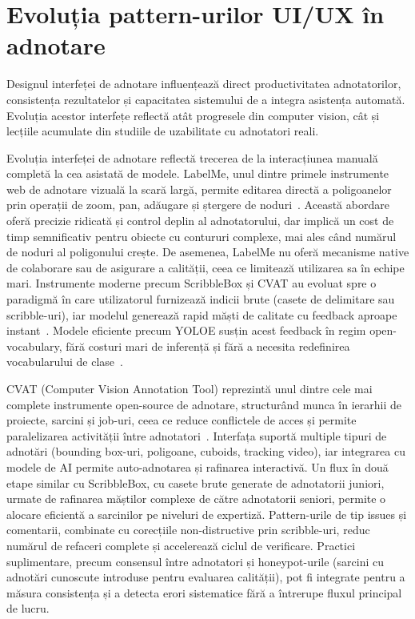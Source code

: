\section{Evoluția pattern-urilor UI/UX în adnotare}

Designul interfeței de adnotare influențează direct productivitatea adnotatorilor, consistența rezultatelor și capacitatea sistemului de a integra asistența automată. Evoluția acestor interfețe reflectă atât progresele din computer vision, cât și lecțiile acumulate din studiile de uzabilitate cu adnotatori reali.

Evoluția interfeței de adnotare reflectă trecerea de la interacțiunea manuală completă la cea asistată de modele. LabelMe, unul dintre primele instrumente web de adnotare vizuală la scară largă, permite editarea directă a poligoanelor prin operații de zoom, pan, adăugare și ștergere de noduri~\cite{5483185}. Această abordare oferă precizie ridicată și control deplin al adnotatorului, dar implică un cost de timp semnificativ pentru obiecte cu contururi complexe, mai ales când numărul de noduri al poligonului crește. De asemenea, LabelMe nu oferă mecanisme native de colaborare sau de asigurare a calității, ceea ce limitează utilizarea sa în echipe mari. Instrumente moderne precum ScribbleBox și CVAT au evoluat spre o paradigmă în care utilizatorul furnizează indicii brute (casete de delimitare sau scribble-uri), iar modelul generează rapid măști de calitate cu feedback aproape instant~\cite{chen2020scribbleboxinteractiveannotationframework,cvat2025}. Modele eficiente precum YOLOE susțin acest feedback în regim open-vocabulary, fără costuri mari de inferență și fără a necesita redefinirea vocabularului de clase~\cite{wang2025yoloerealtimeseeing}.

CVAT (Computer Vision Annotation Tool) reprezintă unul dintre cele mai complete instrumente open-source de adnotare, structurând munca în ierarhii de proiecte, sarcini și job-uri, ceea ce reduce conflictele de acces și permite paralelizarea activității între adnotatori~\cite{cvat2025}. Interfața suportă multiple tipuri de adnotări (bounding box-uri, poligoane, cuboids, tracking video), iar integrarea cu modele de AI permite auto-adnotarea și rafinarea interactivă. Un flux în două etape similar cu ScribbleBox, cu casete brute generate de adnotatorii juniori, urmate de rafinarea măștilor complexe de către adnotatorii seniori, permite o alocare eficientă a sarcinilor pe niveluri de expertiză. Pattern-urile de tip issues și comentarii, combinate cu corecțiile non-distructive prin scribble-uri, reduc numărul de refaceri complete și accelerează ciclul de verificare. Practici suplimentare, precum consensul între adnotatori și honeypot-urile (sarcini cu adnotări cunoscute introduse pentru evaluarea calității), pot fi integrate pentru a măsura consistența și a detecta erori sistematice fără a întrerupe fluxul principal de lucru.

